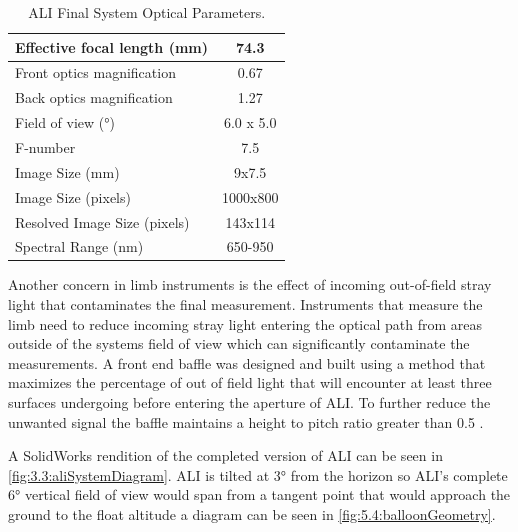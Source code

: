 \documentclass[12pt]{article}
\begin{document}
\begin{table}[!ht]
    \begin{center}
    \begin{tabular}{|l|c|}
      \hline
      Effective focal length (mm) & 74.3 \\
      \hline
      Front optics magnification & 0.67 \\
      \hline
      Back optics magnification & 1.27 \\
      \hline
      Field of view (\si{\degree}) & 6.0 x 5.0 \\
      \hline
      F-number & 7.5 \\
      \hline
      Image Size (mm) & 9x7.5\\
      \hline
      Image Size (pixels) & 1000x800\\
      \hline
      Resolved Image Size (pixels) & 143x114\\
      \hline
      Spectral Range (nm) & 650-950\\
      \hline
    \end{tabular}
    \end{center}
    \caption{ALI Final System Optical Parameters.}
    \label{tab:3.2:ALISystemParameters}
\end{table}

Another concern in limb instruments is the effect of incoming out-of-field stray light that contaminates the final measurement. Instruments that measure the limb need to reduce incoming stray light entering the optical path from areas outside of the systems field of view which can significantly contaminate the measurements. A front end baffle was designed and built using a method that maximizes the percentage of out of field light that will encounter at least three surfaces undergoing before entering the aperture of ALI. To further reduce the unwanted signal the baffle maintains a height to pitch ratio greater than 0.5 \citep{Fischer2008}.


A SolidWorks rendition of the completed version of ALI can be seen in \autoref{fig:3.3:aliSystemDiagram}. ALI is tilted at 3\si{\degree} from the horizon so ALI's complete 6\si{\degree} vertical field of view would span from a tangent point that would approach the ground to the float altitude a diagram can be seen in \autoref{fig:5.4:balloonGeometry}.
\end{document}
